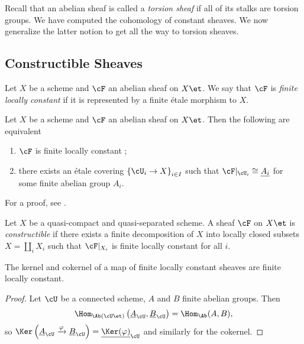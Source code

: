 Recall that an abelian sheaf is called a \emph{torsion sheaf} if all of its stalks are torsion groups. We have computed the cohomology of constant sheaves. We now generalize the latter notion to get all the way to torsion sheaves.

\subsection{Constructible Sheaves}

\begin{defi}
Let $X$ be a scheme and $\cF$ an abelian sheaf on $X\et$. We say that $\cF$ is \emph{finite locally constant} if it is represented by a finite \'etale morphism to $X$. 
\end{defi}

\begin{lem} \label{lem:CharacterizationOfFiniteLocallyConstant}
Let $X$ be a scheme and $\cF$ an abelian sheaf on $X\et$. Then the following are equivalent
\begin{enumerate}[\it i.]
\item 
$\cF$ is finite locally constant ;
\item 
there exists an \'etale covering $\left\{ \cU_i \to X\right\}_{i\in I}$ such that $\cF|_{\cU_i} \cong \underline{A_i}$ for some finite abelian group $A_i$.
\end{enumerate}
\end{lem}

For a proof, see \cite{SGA4.5}.

\begin{defi}
Let $X$ be a quasi-compact and quasi-separated scheme. A sheaf $\cF$ on $X\et$ is \emph{constructible} if there exists a finite decomposition of $X$ into locally closed subsets $X=\coprod_i X_i$ such that $\cF|_{X_i}$ is finite locally constant for all $i$.
\end{defi}

\begin{lem}  \label{lem:KerOfFiniteLocallyConstant}
The kernel and cokernel of a map of finite locally constant sheaves are finite locally constant. 
\end{lem}

\begin{proof}
Let $\cU$ be a connected scheme, $A$ and $B$ finite abelian groups. Then 
$$
\Hom_{\Ab(\cU\et)} \left(\underline A_\cU, \underline B_\cU\right) = \Hom_{\Ab}(A, B),
$$ 
so $\Ker\left(\underline A_\cU \xrightarrow{\varphi} \underline B_\cU\right) = \underline{\Ker(\varphi)}_\cU$ and similarly for the cokernel. 
\end{proof}

